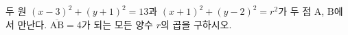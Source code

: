 두 원 $(x-3)^2 + (y+1)^2 = 13$과 $(x+1)^2 + (y-2)^2 = r^2$가 두 점 $\mathrm{A}$, $\mathrm{B}$에서 만난다.
$\overline{\mathrm{AB}} = 4$가 되는 모든 양수 $r$의 곱을 구하시오.
